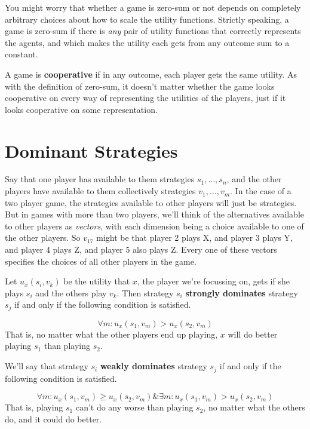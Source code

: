 \documentclass[openany]{book}
\begin{document}
You might worry that whether a game is zero-sum or not depends on completely arbitrary choices about how to scale the utility functions. Strictly speaking, a game is zero-sum if there is \textit{any} pair of utility functions that correctly represents the agents, and which makes the utility each gets from any outcome sum to a constant. 

A game is \textbf{cooperative} if in any outcome, each player gets the same utility. As with the definition of zero-sum, it doesn't matter whether the game looks cooperative on every way of representing the utilities of the players, just if it looks cooperative on some representation.

\section{Dominant Strategies}
Say that one player has available to them strategies $s_1, \dots, s_n$, and the other players have available to them collectively strategies $v_1, \dots, v_m$. In the case of a two player game, the strategies available to other players will just be strategies. But in games with more than two players, we'll think of the alternatives available to other players as \textit{vectors}, with each dimension being a choice available to one of the other players. So $v_17$ might be that player 2 plays X, and player 3 plays Y, and player 4 plays Z, and player 5 also plays Z. Every one of these vectors specifies the choices of all other players in the game. 

Let $u_x(s_i, v_k)$ be the utility that $x$, the player we're focussing on, gets if she plays $s_i$ and the others play $v_k$. Then strategy $s_i$ \textbf{strongly dominates} strategy $s_j$ if and only if the following condition is satisfied.

\begin{equation*}
\forall m: u_x(s_1, v_m) > u_x(s_2, v_m)
\end{equation*}
That is, no matter what the other players end up playing, $x$ will do better playing $s_1$ than playing $s_2$.

We'll say that strategy $s_i$ \textbf{weakly dominates} strategy $s_j$ if and only if the following condition is satisfied.

\begin{equation*}
\forall m: u_x(s_1, v_m) \geq u_x(s_2, v_m) \& \exists m: u_x(s_1, v_m) > u_x(s_2, v_m)
\end{equation*}
That is, playing $s_1$ can't do any worse than playing $s_2$, no matter what the others do, and it could do better.
\end{document}
